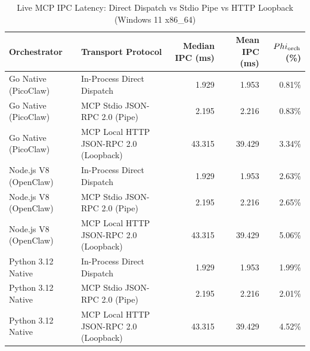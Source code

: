 \begin{table}[t]
\centering\small
\caption{Live MCP IPC Latency: Direct Dispatch vs Stdio Pipe vs HTTP Loopback (Windows 11 x86_64)}
\label{tab:Windows_mcp_transport}
\begin{tabular}{llrrr}
\toprule
Orchestrator & Transport Protocol & Median IPC (ms) & Mean IPC (ms) & $\\Phi_{\text{orch}}$ (\%) \\
\midrule
Go Native (PicoClaw) & In-Process Direct Dispatch & 1.929 & 1.953 & 0.81\% \\
Go Native (PicoClaw) & MCP Stdio JSON-RPC 2.0 (Pipe) & 2.195 & 2.216 & 0.83\% \\
Go Native (PicoClaw) & MCP Local HTTP JSON-RPC 2.0 (Loopback) & 43.315 & 39.429 & 3.34\% \\
Node.js V8 (OpenClaw) & In-Process Direct Dispatch & 1.929 & 1.953 & 2.63\% \\
Node.js V8 (OpenClaw) & MCP Stdio JSON-RPC 2.0 (Pipe) & 2.195 & 2.216 & 2.65\% \\
Node.js V8 (OpenClaw) & MCP Local HTTP JSON-RPC 2.0 (Loopback) & 43.315 & 39.429 & 5.06\% \\
Python 3.12 Native & In-Process Direct Dispatch & 1.929 & 1.953 & 1.99\% \\
Python 3.12 Native & MCP Stdio JSON-RPC 2.0 (Pipe) & 2.195 & 2.216 & 2.01\% \\
Python 3.12 Native & MCP Local HTTP JSON-RPC 2.0 (Loopback) & 43.315 & 39.429 & 4.52\% \\
\bottomrule
\end{tabular}
\end{table}
